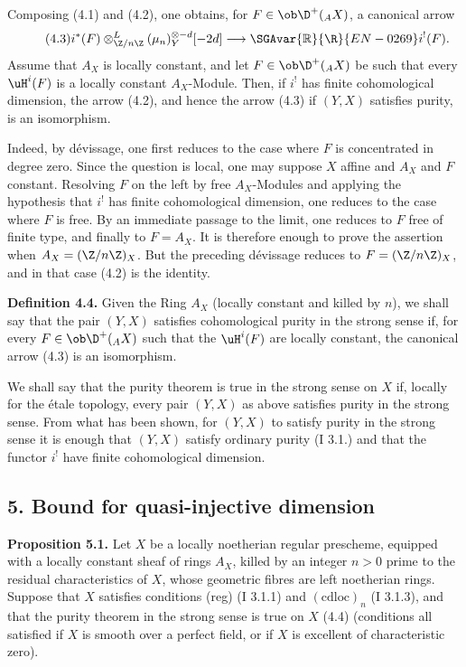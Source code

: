 Composing (4.1) and (4.2), one obtains, for $F\in\ob\D^+({}_A X)$, a canonical arrow
\begin{equation}\tag{4.3}
        i^*(F)\otimes^L_{\Z/n\Z}(\mu_n)_Y^{\otimes -d}[-2d]\longrightarrow \SGAvar{\mathbb{R}}{\R}{EN-0269} i^!(F).
\end{equation}
Assume that $A_X$ is locally constant, and let $F\in\ob\D^+({}_A X)$ be such that every $\uH^i(F)$ is a locally constant $A_X$-Module. Then, if $i^!$ has finite cohomological dimension, the arrow (4.2), and hence the arrow (4.3) if $(Y,X)$ satisfies purity, is an isomorphism.

Indeed, by dévissage, one first reduces to the case where $F$ is concentrated in degree zero. Since the question is local, one may suppose $X$ affine and $A_X$ and $F$ constant. Resolving $F$ on the left by free $A_X$-Modules and applying the hypothesis that $i^!$ has finite cohomological dimension, one reduces to the case where $F$ is free. By an immediate passage to the limit, one reduces to $F$ free of finite type, and finally to $F=A_X$. It is therefore enough to prove the assertion when $A_X=(\Z/n\Z)_X$. But the preceding dévissage reduces to $F=(\Z/n\Z)_X$, and in that case (4.2) is the identity.

\textbf{Definition 4.4.} Given the Ring $A_X$ (locally constant and killed by $n$), we shall say that the pair $(Y,X)$ satisfies cohomological purity in the strong sense if, for every $F\in\ob\D^+({}_A X)$ such that the $\uH^i(F)$ are locally constant, the canonical arrow (4.3) is an isomorphism.

We shall say that the purity theorem is true in the strong sense on $X$ if, locally for the étale topology, every pair $(Y,X)$ as above satisfies purity in the strong sense. From what has been shown, for $(Y,X)$ to satisfy purity in the strong sense it is enough that $(Y,X)$ satisfy ordinary purity (I 3.1.) and that the functor $i^!$ have finite cohomological dimension.

\subsection*{5. Bound for quasi-injective dimension}

\textbf{Proposition 5.1.} Let $X$ be a locally noetherian regular prescheme, equipped with a locally constant sheaf of rings $A_X$, killed by an integer $n>0$ prime to the residual characteristics of $X$, whose geometric fibres are left noetherian rings. Suppose that $X$ satisfies conditions (reg) (I 3.1.1) and $(\mathrm{cdloc})_n$ (I 3.1.3), and that the purity theorem in the strong sense is true on $X$ (4.4) (conditions all satisfied if $X$ is smooth over a perfect field, or if $X$ is excellent of characteristic zero).


